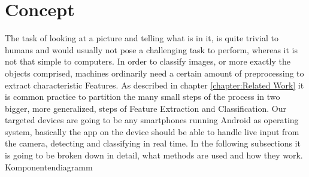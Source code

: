 \chapter{Concept}\label{chapter:Concept}

The task of looking at a picture and telling what is in it, is quite trivial to humans and would usually not pose a challenging task to perform, whereas it is not that simple to computers. In order to classify images, or more exactly the objects comprised, machines ordinarily need a certain amount of preprocessing to extract characteristic Features. As described in chapter \ref{chapter:Related Work} it is common practice to partition the many small steps of the process in two bigger, more generalized, steps of Feature Extraction and Classification. Our targeted devices are going to be any smartphones running Android as operating system, basically the app on the device should be able to handle live input from the camera, detecting and classifying in real time. In the following subsections it is going to be broken down in detail, what  methods are used and how they work. \newline\newline\newline
Komponentendiagramm\newline


